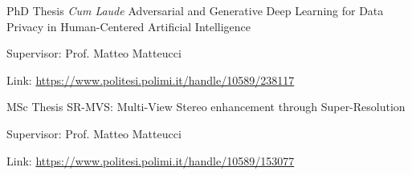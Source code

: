 \begin{cventries}
  \cventry
    {PhD Thesis \emph{Cum Laude}} %
    {Adversarial and Generative Deep Learning for Data Privacy in Human-Centered Artificial Intelligence} %
    {} %
    {} %
    {
      \begin{cvitems} %
        \item {Supervisor: Prof. Matteo Matteucci}
        \item {Link: \url{https://www.politesi.polimi.it/handle/10589/238117}} 
      \end{cvitems}
    }
    \vspace{2mm}
  \cventry
    {MSc Thesis} %
    {SR-MVS: Multi-View Stereo enhancement through Super-Resolution} %
    {} %
    {} %
    {
      \begin{cvitems} %
        \item {Supervisor: Prof. Matteo Matteucci}
        \item {Link: \url{https://www.politesi.polimi.it/handle/10589/153077}} 
      \end{cvitems}
    }
    \vspace{1cm}
\end{cventries}